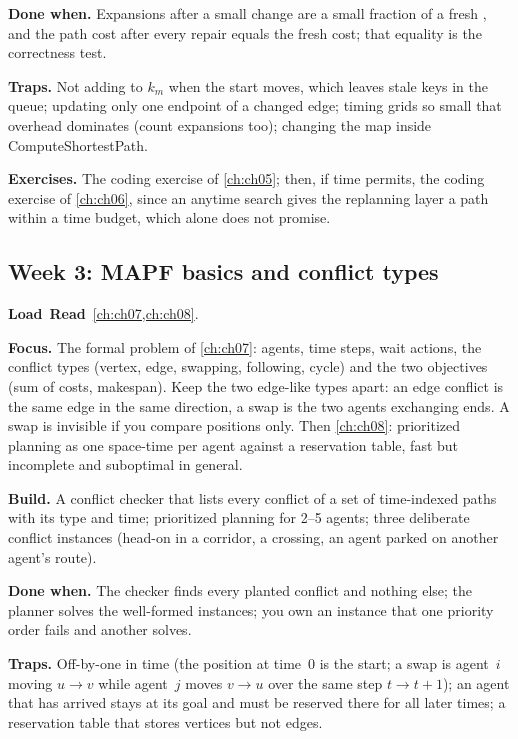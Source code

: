 \textbf{Done when.} Expansions after a small change are a small fraction of a fresh \astar,
and the path cost after every repair equals the fresh \astar cost; that equality is the
correctness test.

\textbf{Traps.} Not adding to $k_m$ when the start moves, which leaves stale keys in the
queue; updating only one endpoint of a changed edge; timing grids so small that \python
overhead dominates (count expansions too); changing the map inside ComputeShortestPath.

\textbf{Exercises.} The coding exercise of \cref{ch:ch05}; then, if time permits, the coding
exercise of \cref{ch:ch06}, since an anytime search gives the replanning layer a path within
a time budget, which \dstarlite alone does not promise.

\subsection{Week 3: MAPF basics and conflict types}
\label{sec:appA-week03}
\noindent\textbf{Load}\ \quad\textbf{Read}\ \cref{ch:ch07,ch:ch08}.

\textbf{Focus.} The formal problem of \cref{ch:ch07}: agents, time steps, wait actions, the
conflict types (vertex, edge, swapping, following, cycle) and the two objectives (sum of
costs, makespan). Keep the two edge-like types apart: an edge conflict is the same edge in
the same direction, a swap is the two agents exchanging ends. A swap is invisible if you
compare positions only. Then \cref{ch:ch08}:
prioritized planning as one space-time \astar per agent against a reservation table, fast
but incomplete and suboptimal in general.

\textbf{Build.} A conflict checker that lists every conflict of a set of time-indexed paths
with its type and time; prioritized planning for 2--5 agents; three deliberate conflict
instances (head-on in a corridor, a crossing, an agent parked on another agent's route).

\textbf{Done when.} The checker finds every planted conflict and nothing else; the planner
solves the well-formed instances; you own an instance that one priority order fails and
another solves.

\textbf{Traps.} Off-by-one in time (the position at time~0 is the start; a swap is
agent~$i$ moving $u \to v$ while agent~$j$ moves $v \to u$ over the same step
$t \to t+1$); an agent that has arrived stays at its goal and must be
reserved there for all later times; a reservation table that stores vertices but not edges.

